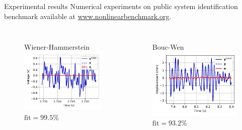 \documentclass{beamer}
\begin{document}
\begin{frame}{Experimental results}
 Numerical experiments on public system identification benchmark available at \url{www.nonlinearbenchmark.org}.
 \begin{columns}
   \centering
  \begin{figure}
  \footnotesize
  Wiener-Hammerstein\\
   \includegraphics[width=.99\textwidth]{img/WH_timetrace.pdf}
   $\mathrm{fit} = 99.5\%$
  \end{figure}
  \begin{figure}
  \footnotesize
  Bouc-Wen
   \includegraphics[width=.99\textwidth]{img/BW_timetrace.pdf}
   $\mathrm{fit} = 93.2\%$

\end{figure}
\end{columns}
\end{frame}
\end{document}
